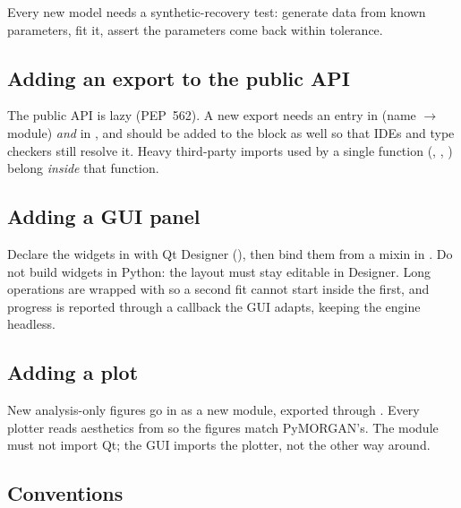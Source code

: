 Every new model needs a synthetic-recovery test: generate data from known
parameters, fit it, assert the parameters come back within tolerance.

\subsection{Adding an export to the public API}

The public API is lazy (PEP~562). A new export needs an entry in
 (name $\rightarrow$ module) \emph{and} in ,
and should be added to the  block as well so that IDEs and
type checkers still resolve it. Heavy third-party imports used by a single
function (, , ) belong
\emph{inside} that function.

\subsection{Adding a GUI panel}

Declare the widgets in  with Qt Designer
(), then bind them from a mixin in
. Do not build widgets in Python: the layout must stay editable
in Designer. Long operations are wrapped with  so a second
fit cannot start inside the first, and progress is reported through a callback
the GUI adapts, keeping the engine headless.

\subsection{Adding a plot}

New analysis-only figures go in  as a new module, exported through
. Every plotter reads aesthetics from
 so the figures match PyMORGAN's. The module
must not import Qt; the GUI imports the plotter, not the other way around.

\subsection{Conventions}

